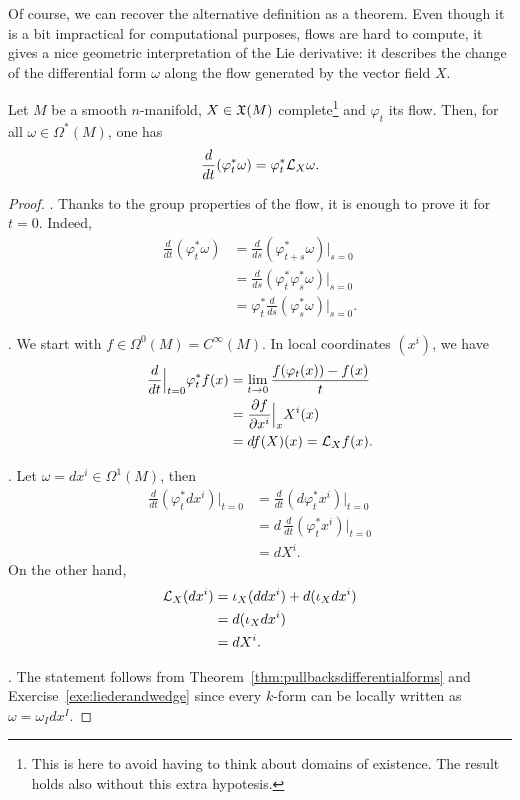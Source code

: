 Of course, we can recover the alternative definition as a theorem.
Even though it is a bit impractical for computational purposes, flows are hard to compute, it gives a nice geometric interpretation of the Lie derivative: it describes the change of the differential form $\omega$ along the flow generated by the vector field $X$.

\begin{theorem}\label{thm:LieDerivativeFlow}
  Let $M$ be a smooth $n$-manifold, $X\in\mathfrak{X}(M)$ complete\footnote{This is here to avoid having to think about domains of existence. The result holds also without this extra hypotesis.} and $\varphi_t$ its flow.
  Then, for all $\omega\in \Omega^*(M)$, one has
  \begin{equation}
    \frac{d}{dt}(\varphi_t^* \omega) = \varphi_t^*\mathcal{L}_X\omega.
  \end{equation}
\end{theorem}
\begin{proof}
  .
  Thanks to the group properties of the flow, it is enough to prove it for $t=0$.
  Indeed,
  \begin{align}
    \frac{d}{dt}(\varphi_t^* \omega)
     & = \frac{d}{ds}(\varphi_{t+s}^* \omega)\Big|_{s=0}         \\
     & = \frac{d}{ds}(\varphi_t^*\varphi_s^*\omega)\Big|_{s=0}   \\
     & = \varphi^*_t \frac{d}{ds}(\varphi_s^*\omega)\Big|_{s=0}.
  \end{align}

  .
  We start with $f\in\Omega^0(M) = C^\infty(M)$.
  In local coordinates $(x^i)$, we have
  \begin{align}
    \frac{d}{dt}\Big|_{t=0}\varphi_t^* f(x)
     & = \lim_{t\to0} \frac{f(\varphi_t(x)) - f(x)}{t} \\
     & = \frac{\partial f}{\partial x^i}\Big|_x X^i(x) \\
     & = df(X)(x) = \mathcal{L}_X f(x).
  \end{align}

  . Let $\omega = dx^i \in \Omega^1(M)$, then
  \begin{align}
    \frac{d}{dt}(\varphi_t^* dx^i)\Big|_{t=0}
     & = \frac{d}{dt}(d\varphi_t^* x^i)\Big|_{t=0}    \\
     & = d\, \frac{d}{dt}(\varphi_t^* x^i)\Big|_{t=0} \\
     & = dX^i.
  \end{align}
  On the other hand,
  \begin{align}
    \mathcal{L}_X(dx^i)
     & = \iota_X(ddx^i) + d(\iota_X dx^i) \\
     & = d(\iota_X dx^i)                  \\
     & = dX^i.
  \end{align}

  . The statement follows from Theorem~\ref{thm:pullbacksdifferentialforms} and Exercise~\ref{exe:liederandwedge} since every $k$-form can be locally written as $\omega = \omega_I dx^I$.
\end{proof}

